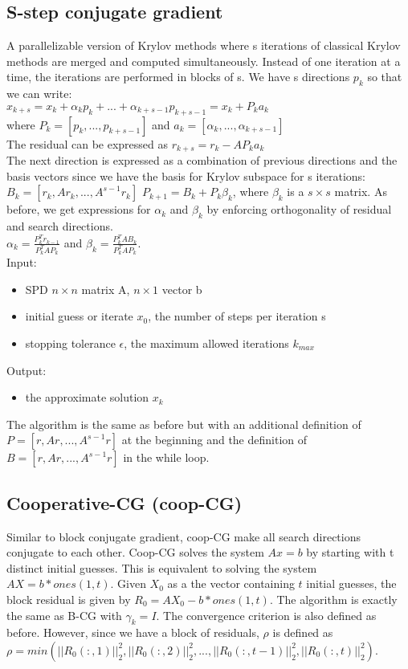 \documentclass[]{scrartcl}
\begin{document}
\subsection{S-step conjugate gradient}
A parallelizable version of Krylov methods where s iterations of classical Krylov methods are merged and computed simultaneously. Instead of one iteration at a time, the iterations are performed in blocks of s.
We have s directions $p_{k}$ so that we can write: \\ $x_{k+s}=x_{k}+\alpha_{k}p_{k}+...+\alpha_{k+s-1}p_{k+s-1}=x_{k}+P_{k}a_{k}$ \\ where $P_{k}=[p_{k}, ..., p_{k+s-1}]$ and $a_{k}=[\alpha_{k}, ..., \alpha_{k+s-1}]$ \\
The residual can be expressed as $r_{k+s}=r_{k}-AP_{k}a_{k}$ \\
The next direction is expressed as a combination of previous directions and the basis vectors since we have the basis for Krylov subspace for s iterations: $B_{k}=[r_{k}, Ar_{k}, ..., A^{s-1}r_{k}]$
$P_{k+1}=B_{k}+P_{k}\beta_{k}$, where $\beta_{k}$ is a $s\times s$ matrix.
As before, we get expressions for $\alpha_{k}$ and $\beta_{k}$ by enforcing orthogonality of residual and search directions.\\
$\alpha_{k}=\frac{P^{T}_{k}r_{k-1}}{P^{T}_{k}AP_{k}}$ and $\beta_{k}=\frac{P^{T}_{k}AB_{k}}{P^{T}_{k}AP_{k}}$. \\
Input: 
\begin{itemize}
	\item SPD $n\times n$ matrix A, $n\times 1$ vector b
	\item initial guess or iterate $x_{0}$, the number of steps per iteration s
	\item stopping tolerance $\epsilon$, the maximum allowed iterations $k_{max}$ 
\end{itemize}
Output:
\begin{itemize}
	\item the approximate solution $x_{k}$ 
\end{itemize}
The algorithm is the same as before but with an additional definition of $P=[r, Ar, ..., A^{s-1}r]$ at the beginning and the definition of $B=[r, Ar, ..., A^{s-1}r]$ in the while loop.
\subsection{Cooperative-CG (coop-CG)}
Similar to block conjugate gradient, coop-CG make all search directions conjugate to each other. Coop-CG solves the system $Ax=b$ by starting with t distinct initial guesses. This is equivalent to solving the system $AX=b*ones(1,t)$. Given $X_{0}$ as a the vector containing $t$ initial guesses, the block residual is given by $R_{0}=AX_{0}-b*ones(1,t)$. The algorithm is exactly the same as B-CG with $\gamma_{k}=I$. The convergence criterion is also defined as before. However, since we have a block of residuals, $\rho$ is defined as $\rho=min(||R_{0}(:,1)||_{2}^{2}, ||R_{0}(:,2)||_{2}^{2}, ..., ||R_{0}(:,t-1)||_{2}^{2}, ||R_{0}(:,t)||_{2}^{2})$.
\end{document}
